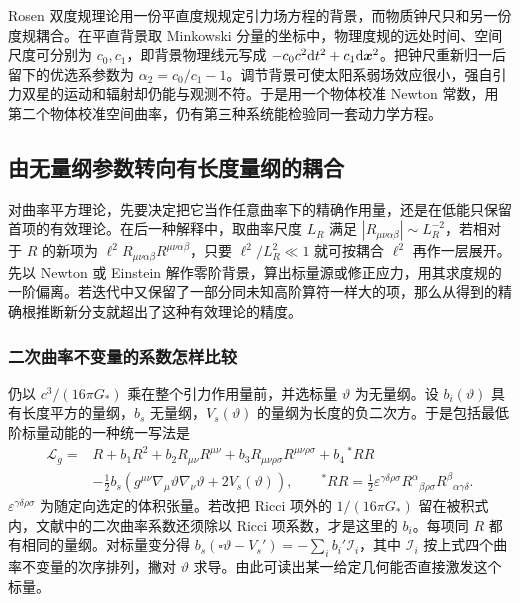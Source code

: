 Rosen 双度规理论用一份平直度规规定引力场方程的背景，而物质钟尺只和另一份度规耦合。在平直背景取 Minkowski 分量的坐标中，物理度规的远处时间、空间尺度可分别为 $c_0,c_1$，即背景物理线元写成 $-c_0 c^2\dd t^2+c_1\dd\bm x^2$。把钟尺重新归一后留下的优选系参数为 $\alpha_2=c_0/c_1-1$。调节背景可使太阳系弱场效应很小，强自引力双星的运动和辐射却仍能与观测不符。于是用一个物体校准 Newton 常数，用第二个物体校准空间曲率，仍有第三种系统能检验同一套动力学方程。

\subsection{由无量纲参数转向有长度量纲的耦合}

对曲率平方理论，先要决定把它当作任意曲率下的精确作用量，还是在低能只保留首项的有效理论。在后一种解释中，取曲率尺度 $L_R$ 满足 $|R_{\mu\nu\alpha\beta}|\sim L_R^{-2}$，若相对于 $R$ 的新项为 $\ell^2 R_{\mu\nu\alpha\beta}R^{\mu\nu\alpha\beta}$，只要 $\ell^2/L_R^2\ll1$ 就可按耦合 $\ell^2$ 再作一层展开。先以 Newton 或 Einstein 解作零阶背景，算出标量源或修正应力，用其求度规的一阶偏离。若迭代中又保留了一部分同未知高阶算符一样大的项，那么从得到的精确根推断新分支就超出了这种有效理论的精度。

\subsubsection{二次曲率不变量的系数怎样比较}

仍以 $c^3/(16\pi G_*)$ 乘在整个引力作用量前，并选标量 $\vartheta$ 为无量纲。设 $b_i(\vartheta)$ 具有长度平方的量纲，$b_s$ 无量纲，$V_s(\vartheta)$ 的量纲为长度的负二次方。于是包括最低阶标量动能的一种统一写法是
\begin{align*}
 \mathcal L_g={}&R+b_1 R^2+b_2 R_{\mu\nu}R^{\mu\nu}
       +b_3 R_{\mu\nu\rho\sigma}R^{\mu\nu\rho\sigma}
       +b_4\,{}^*RR \\
       &-\tfrac12 b_s\left(g^{\mu\nu}\nabla_\mu\vartheta\nabla_\nu\vartheta
                         +2 V_s(\vartheta)\right),\qquad
 {}^*RR=\tfrac12\varepsilon^{\gamma\delta\rho\sigma}
             R^\alpha{}_{\beta\rho\sigma} R^\beta{}_{\alpha\gamma\delta}.
\end{align*}
$\varepsilon^{\gamma\delta\rho\sigma}$ 为随定向选定的体积张量。若改把 Ricci 项外的 $1/(16\pi G_*)$ 留在被积式内，文献中的二次曲率系数还须除以 Ricci 项系数，才是这里的 $b_i$。每项同 $R$ 都有相同的量纲。对标量变分得 $b_s(\square\vartheta-V_s')=-\sum_i b_i'\mathcal I_i$，其中 $\mathcal I_i$ 按上式四个曲率不变量的次序排列，撇对 $\vartheta$ 求导。由此可读出某一给定几何能否直接激发这个标量。

